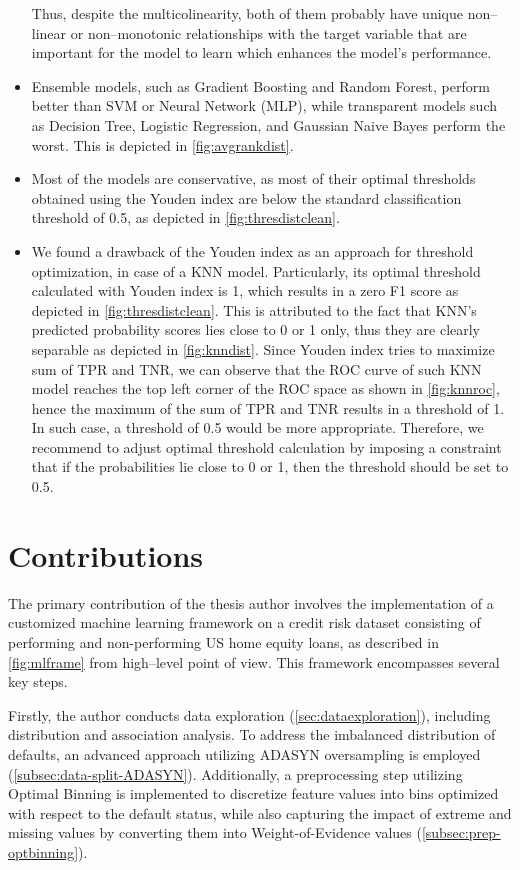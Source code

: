 \begin{itemize}
    Thus, despite the multicolinearity, both of them probably have unique non--linear or non--monotonic relationships with the target variable that are important for the model to learn which enhances the model's performance.
    \item Ensemble models, such as Gradient Boosting and Random Forest, perform better than SVM or Neural Network (MLP), while transparent models such as Decision Tree, Logistic Regression, and Gaussian Naive Bayes perform the worst. This is depicted in \autoref{fig:avgrankdist}.
    \item Most of the models are conservative, as most of their optimal thresholds obtained using the Youden index are below the standard classification threshold of 0.5, as depicted in \autoref{fig:thresdistclean}.
    \item We found a drawback of the Youden index as an approach for threshold optimization, in case of a KNN model. Particularly, its optimal threshold calculated with Youden index is 1, which results in a zero F1 score as depicted in \autoref{fig:thresdistclean}. This is attributed to the fact that KNN's predicted probability scores lies close to 0 or 1 only, thus they are clearly separable as depicted in \autoref{fig:knndist}.
    Since Youden index tries to maximize sum of TPR and TNR, we can observe that the ROC curve of such KNN model reaches the top left corner of the ROC space as shown in \autoref{fig:knnroc}, hence the maximum of the sum of TPR and TNR results in a threshold of 1. In such case, a threshold of 0.5 would be more appropriate.
    Therefore, we recommend to adjust optimal threshold calculation by imposing a constraint that if the probabilities lie close to 0 or 1, then the threshold should be set to 0.5.
\end{itemize}
\newpage
\section{Contributions}
\label{sec:contributions}
The primary contribution of the thesis author involves the implementation of a customized machine learning framework on a credit risk dataset consisting of performing and non-performing US home equity loans, as described in \autoref{fig:mlframe} from high--level point of view. This framework encompasses several key steps.


Firstly, the author conducts data exploration (\autoref{sec:dataexploration}), including distribution and association analysis. To address the imbalanced distribution of defaults, an advanced approach utilizing ADASYN oversampling is employed (\autoref{subsec:data-split-ADASYN}).
Additionally, a preprocessing step utilizing Optimal Binning is implemented to discretize feature values into bins optimized with respect to the default status, while also capturing the impact of extreme and missing values by converting them into Weight-of-Evidence values (\autoref{subsec:prep-optbinning}).


